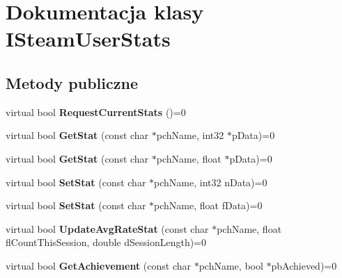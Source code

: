 \hypertarget{class_i_steam_user_stats}{}\section{Dokumentacja klasy I\+Steam\+User\+Stats}
\label{class_i_steam_user_stats}
\subsection*{Metody publiczne}
\begin{DoxyCompactItemize}
\item 
\mbox{\label{class_i_steam_user_stats_abb2ea3bbab0b6a49b82f3909e8a607e4}} 
virtual bool {\bfseries Request\+Current\+Stats} ()=0
\item 
\mbox{\label{class_i_steam_user_stats_a66735bcffab97ea09ababd2612373ab0}} 
virtual bool {\bfseries Get\+Stat} (const char $\ast$pch\+Name, int32 $\ast$p\+Data)=0
\item 
\mbox{\label{class_i_steam_user_stats_aa0596845bd059b035921df15fa44f2f3}} 
virtual bool {\bfseries Get\+Stat} (const char $\ast$pch\+Name, float $\ast$p\+Data)=0
\item 
\mbox{\label{class_i_steam_user_stats_a37327970ed85b6f377d537ca2d7e35e7}} 
virtual bool {\bfseries Set\+Stat} (const char $\ast$pch\+Name, int32 n\+Data)=0
\item 
\mbox{\label{class_i_steam_user_stats_a2e09f8c4ea8f57cdb5641f86752633af}} 
virtual bool {\bfseries Set\+Stat} (const char $\ast$pch\+Name, float f\+Data)=0
\item 
\mbox{\label{class_i_steam_user_stats_a67dc594db3f8e73f78e9c48df2f2ddba}} 
virtual bool {\bfseries Update\+Avg\+Rate\+Stat} (const char $\ast$pch\+Name, float fl\+Count\+This\+Session, double d\+Session\+Length)=0
\item 
\mbox{\label{class_i_steam_user_stats_aeba9299bfdc1c7d8eeef8ab1995085c3}} 
virtual bool {\bfseries Get\+Achievement} (const char $\ast$pch\+Name, bool $\ast$pb\+Achieved)=0
\item 

\end{DoxyCompactItemize}
